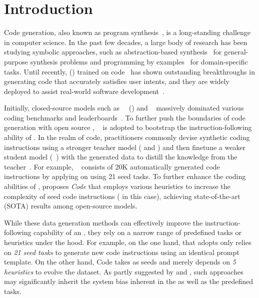 \section{Introduction}
{
Code generation, also known as program synthesis~\cite{PGL-010}, is a long-standing challenge in computer science.
In the past few decades, a large body of research has been studying symbolic approaches, such as abstraction-based synthesis~\cite{abstractRefinement, conflictDriven} for general-purpose synthesis problems and programming by examples~\cite{flashfill, liu2023neuri} for domain-specific tasks. %
Until recently,  () trained on code~\cite{synthesisllm,codex} has shown outstanding breakthroughs in generating code that accurately satisfies user intents, and they are widely deployed to assist real-world software development~\cite{copilot,codewhisperer}.
}

Initially, closed-source models such as \gptthreefiveturb~\cite{chatgpt}~(\ie \chatgpt) and \gptfour~\cite{gpt4} massively dominated various coding benchmarks and leaderboards~\cite{codex,synthesisllm,liu2023code,ds1000, xia2023keep}.
To further push the boundaries of code generation with open source , \emph{\selfinstruct{}}~\cite{selfinstruct} is adopted to bootstrap
{the instruction-following ability of }.
In the realm of code, practitioners commonly devise synthetic coding instructions using a stronger teacher model (\eg \chatgpt{} and \gptfour) and then finetune a weaker student model (\eg \codellama~\cite{codellama}) with the generated data to distill the knowledge from the teacher~\cite{alpaca, codealpaca}.
For example, \codealpaca{}~\cite{codealpaca} consists of 20K automatically generated code instructions by applying \selfinstruct{} on \chatgpt{} using 21 seed tasks.
To further enhance the coding abilities of , \citet{wizardcoder} proposes \emph{Code \evolinstruct} that employs various heuristics to increase the complexity of seed code instructions (\codealpaca{} in this case), achieving state-of-the-art (SOTA) results among open-source models.

While these data generation methods can effectively improve the instruction-following capability of an \llm, they rely on a narrow range of predefined tasks or heuristics under the hood.
For example, on the one hand, \codealpaca{} that adopts \selfinstruct{} only relies on \emph{21 seed tasks} to generate new code instructions using an identical prompt template.
On the other hand, Code \evolinstruct{} takes \codealpaca{} as seeds and merely depends on \emph{5 heuristics} to evolve the dataset.
As partly suggested by \citet{attrprompt} and \citet{selfinstruct}, such approaches may significantly inherit the system bias inherent in the  as well as the predefined tasks.

